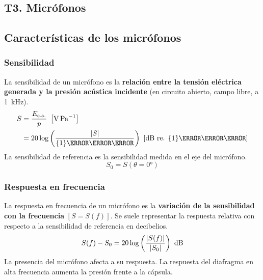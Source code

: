 \documentclass[a4paper, 8pt]{extarticle}
\begin{document}
\setlength{\parskip}{0pt}
\setlength{\parindent}{0pt}
\setlength{\abovedisplayskip}{2pt}
\setlength{\belowdisplayskip}{2pt}
\setlength{\abovedisplayshortskip}{0pt}
\setlength{\belowdisplayshortskip}{0pt}


\pagestyle{empty}
\renewcommand{\arraystretch}{1.5}

\begin{multicols}{3}
  \section{T3. Micrófonos}
  \subsection{Características de los micrófonos}
  \subsubsection{Sensibilidad}
  La sensibilidad de un micrófono es la \textbf{relación entre la tensión eléctrica generada y la presión acústica incidente} (en circuito abierto, campo libre, a \qty{1}{\kilo\hertz}).
  \begin{align*}
    S & = \frac{E_{\text{c.a.}}}{p} \ \left[ \unit{\volt \per \pascal }  \right]                                                                            \\
      & = 20 \log \left( \frac{\abs{S}}{\qty{1}{\volt \per \pascal  } } \right) \ \left[ \unit{\decibel} \text{ re. } \qty{1}{\volt \per \pascal }  \right]
  \end{align*}
  La sensibilidad de referencia es la sensibilidad medida en el eje del micrófono.
  \[ S_0 = S \left( \theta = \ang{0} \right) \]
  \subsubsection{Respuesta en frecuencia}
  La respuesta en frecuencia de un micrófono es la \textbf{variación de la sensibilidad con la frecuencia} $\left[ S = S(f) \right]$. Se suele representar la respuesta relativa con respecto a la sensibilidad de referencia en decibelios.
  \[ S(f) - S_0 = 20 \log \left( \frac{\abs{S(f)}}{\abs{S_0}} \right) \ \unit{\dB} \]
  La presencia del micrófono afecta a su respuesta. La respuesta del diafragma en alta frecuencia aumenta la presión frente a la cápsula.

  \color{red}\xspace

\end{multicols}
\end{document}

